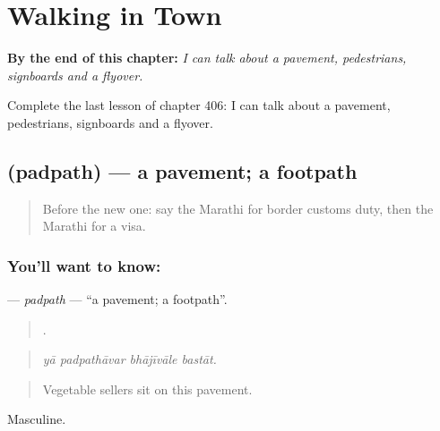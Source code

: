 
\chapter{Walking in Town}
\label{ch:mr-walking-in-town}

\begin{chapteropening}
\textbf{By the end of this chapter:} \emph{I can talk about a pavement, pedestrians, signboards and a flyover.}

Complete the last lesson of chapter 406: I can talk about a pavement, pedestrians, signboards and a flyover.
\end{chapteropening}

\section[\texorpdfstring{\mr{पदपथ} (padpath)}{पदपथ (padpath)}]{ (padpath) — a pavement; a footpath}

\label{lesson:MR-C406-padpath}



\begin{quote}
Before the new one: say the Marathi for border customs duty, then the Marathi for a visa.
\end{quote}

\subsection*{You'll want to know: }
\textbf{} — \emph{padpath} — \textquotedblleft{}a pavement; a footpath\textquotedblright{}.

\begin{quote}
   .
\end{quote}

\begin{quote}
\emph{yā padpathāvar bhājīvāle bastāt.}
\end{quote}

\begin{quote}
Vegetable sellers sit on this pavement.
\end{quote}

Masculine.

